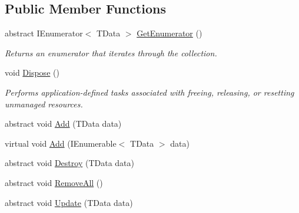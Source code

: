 \subsection*{Public Member Functions}
\begin{DoxyCompactItemize}
\item 
abstract I\+Enumerator$<$ T\+Data $>$ \hyperlink{classCqrs_1_1Azure_1_1BlobStorage_1_1StorageStore_a2eb689ea51d586309b79d6cbac05b616_a2eb689ea51d586309b79d6cbac05b616}{Get\+Enumerator} ()
\begin{DoxyCompactList}\small\item\em Returns an enumerator that iterates through the collection. \end{DoxyCompactList}\item 
void \hyperlink{classCqrs_1_1Azure_1_1BlobStorage_1_1StorageStore_a3fddffcffd2bd3c79212bb6ef2cdc422_a3fddffcffd2bd3c79212bb6ef2cdc422}{Dispose} ()
\begin{DoxyCompactList}\small\item\em Performs application-\/defined tasks associated with freeing, releasing, or resetting unmanaged resources. \end{DoxyCompactList}\item 
abstract void \hyperlink{classCqrs_1_1Azure_1_1BlobStorage_1_1StorageStore_af56bdbd7fa6650aaef5c0bab9ed55f1a_af56bdbd7fa6650aaef5c0bab9ed55f1a}{Add} (T\+Data data)
\item 
virtual void \hyperlink{classCqrs_1_1Azure_1_1BlobStorage_1_1StorageStore_a989d749e5f9efc10b1a416feec02657d_a989d749e5f9efc10b1a416feec02657d}{Add} (I\+Enumerable$<$ T\+Data $>$ data)
\item 
abstract void \hyperlink{classCqrs_1_1Azure_1_1BlobStorage_1_1StorageStore_a9879b4ab18c2a33d7e20bc0b3a734195_a9879b4ab18c2a33d7e20bc0b3a734195}{Destroy} (T\+Data data)
\item 
abstract void \hyperlink{classCqrs_1_1Azure_1_1BlobStorage_1_1StorageStore_a4e848f342be903293812b3b660464d1a_a4e848f342be903293812b3b660464d1a}{Remove\+All} ()
\item 
abstract void \hyperlink{classCqrs_1_1Azure_1_1BlobStorage_1_1StorageStore_ae9ca8bfe30040f77e349a4d47b31da70_ae9ca8bfe30040f77e349a4d47b31da70}{Update} (T\+Data data)
\end{DoxyCompactItemize}
